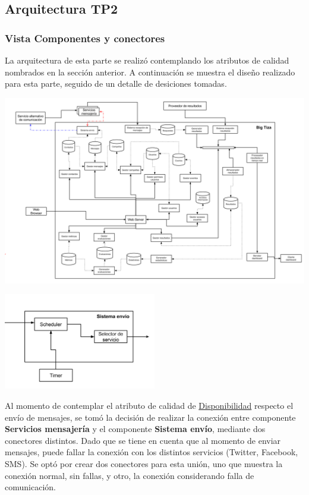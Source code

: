 \documentclass[a4paper, 11pt]{article}
\begin{document}
\newpage
\subsection{Arquitectura TP2}
\subsubsection{Vista Componentes y conectores}
La arquitectura de esta parte se realizó contemplando los atributos de calidad nombrados en la sección anterior. A continuación se muestra el diseño realizado para esta parte, seguido de un detalle de desiciones tomadas.

\centerline{\includegraphics[width=1.2\textwidth]{./diagramas/VistaCompyCon.png}}
\centerline{\includegraphics[width=0.5\textwidth]{./diagramas/ArqTP2conector1.png}}

Al momento de contemplar el atributo de calidad de \underline{Disponibilidad} respecto el envío de mensajes, se tomó la decisión de realizar la conexión entre componente \textbf{Servicios mensajería} y el componente \textbf{Sistema envío}, mediante dos conectores distintos. Dado que se tiene en cuenta que al momento de enviar mensajes, puede fallar la conexión con los distintos servicios (Twitter, Facebook, SMS). 
Se optó por crear dos conectores para esta unión, uno que muestra la conexión normal, sin fallas, y otro, la conexión considerando falla de comunicación.\\
\end{document}
